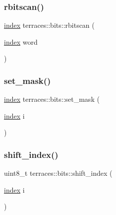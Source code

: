 \mbox{\label{namespaceterraces_1_1bits_a8b6b7055638e4550e4ddb50e0bd7d602}} 
\subsubsection{\texorpdfstring{rbitscan()}{rbitscan()}}
{\footnotesize\ttfamily \hyperlink{namespaceterraces_adbc33ccb543d1634e96d0eb02e472c77}{index} terraces\+::bits\+::rbitscan (\begin{DoxyParamCaption}\item[{\hyperlink{namespaceterraces_adbc33ccb543d1634e96d0eb02e472c77}{index}}]{word }\end{DoxyParamCaption})\hspace{0.3cm}{\ttfamily [inline]}}

\mbox{\label{namespaceterraces_1_1bits_a565f9c808bbf7e0d4c9d75ab7a2cadbf}} 
\subsubsection{\texorpdfstring{set\+\_\+mask()}{set\_mask()}}
{\footnotesize\ttfamily \hyperlink{namespaceterraces_adbc33ccb543d1634e96d0eb02e472c77}{index} terraces\+::bits\+::set\+\_\+mask (\begin{DoxyParamCaption}\item[{\hyperlink{namespaceterraces_adbc33ccb543d1634e96d0eb02e472c77}{index}}]{i }\end{DoxyParamCaption})\hspace{0.3cm}{\ttfamily [inline]}}

\mbox{\label{namespaceterraces_1_1bits_ab572e0592b3131f5450c412546b8bcbd}} 
\subsubsection{\texorpdfstring{shift\+\_\+index()}{shift\_index()}}
{\footnotesize\ttfamily uint8\+\_\+t terraces\+::bits\+::shift\+\_\+index (\begin{DoxyParamCaption}\item[{\hyperlink{namespaceterraces_adbc33ccb543d1634e96d0eb02e472c77}{index}}]{i }\end{DoxyParamCaption})\hspace{0.3cm}{\ttfamily [inline]}}




